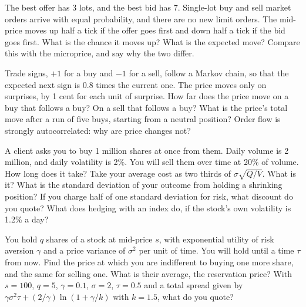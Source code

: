 \begin{question}\label{iq:iv2:markets-and-microstructure:36}
The best offer has 3 lots, and the best bid has 7. Single-lot buy and sell market orders arrive with equal probability, and there are no new limit orders. The mid-price moves up half a tick if the offer goes first and down half a tick if the bid goes first. What is the chance it moves up? What is the expected move? Compare this with the microprice, and say why the two differ.
\end{question}

\begin{question}\label{iq:iv2:markets-and-microstructure:37}
Trade signs, $+1$ for a buy and $-1$ for a sell, follow a Markov chain, so that the expected next sign is 0.8 times the current one. The price moves only on surprises, by 1 cent for each unit of surprise. How far does the price move on a buy that follows a buy? On a sell that follows a buy? What is the price's total move after a run of five buys, starting from a neutral position? Order flow is strongly autocorrelated: why are price changes not?
\end{question}

\begin{question}\label{iq:iv2:markets-and-microstructure:38}
A client asks you to buy 1 million shares at once from them. Daily volume is 2 million, and daily volatility is 2\%. You will sell them over time at 20\% of volume. How long does it take? Take your average cost as two thirds of $\sigma\sqrt{Q/V}$. What is it? What is the standard deviation of your outcome from holding a shrinking position? If you charge half of one standard deviation for risk, what discount do you quote? What does hedging with an index do, if the stock's own volatility is 1.2\% a day?
\end{question}

\begin{question}\label{iq:iv2:markets-and-microstructure:39}
You hold $q$ shares of a stock at mid-price $s$, with exponential utility of risk aversion $\gamma$ and a price variance of $\sigma^2$ per unit of time. You will hold until a time $\tau$ from now. Find the price at which you are indifferent to buying one more share, and the same for selling one. What is their average, the reservation price? With $s = 100$, $q = 5$, $\gamma = 0.1$, $\sigma = 2$, $\tau = 0.5$ and a total spread given by $\gamma\sigma^2\tau + (2/\gamma)\ln(1 + \gamma/k)$ with $k = 1.5$, what do you quote?
\end{question}

